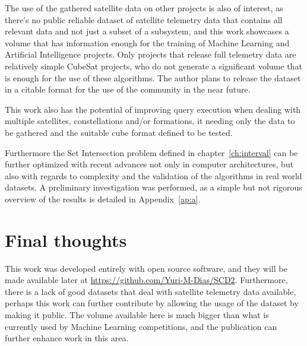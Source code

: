 The use of the gathered satellite data on other projects is also of interest, as there's no public reliable dataset of satellite telemetry data that contains all relevant data and not just a subset of a subsystem, and this work showcases a volume that has information enough for the training of Machine Learning and Artificial Intelligence projects.
Only projects that release full telemetry data are relatively simple CubeSat projects, who do not generate a significant volume that is enough for the use of these algorithms.
The author plans to release the dataset in a citable format for the use of the community in the near future.

This work also has the potential of improving query execution when dealing with multiple satellites, constellations and/or formations, it needing only the data to be gathered and the suitable cube format defined to be tested.

Furthermore the Set Intersection problem defined in chapter~\ref{ch:interval} can be further optimized with recent advances not only in computer architectures, but also with regards to complexity and the validation of the algorithms in real world datasets.
A preliminary investigation was performed, as a simple but not rigorous overview of the results is detailed in Appendix~\ref{ap:a}.

\section{Final thoughts}\label{ch:concl:future}


This work was developed entirely with open source software, and they will be made available later at \url{https://github.com/Yuri-M-Dias/SCD2}.
Furthermore, there is a lack of good datasets that deal with satellite telemetry data available, perhaps this work can further contribute by allowing the usage of the dataset by making it public.
The volume available here is much bigger than what is currently used by Machine Learning competitions, and the publication can further enhance work in this area.

